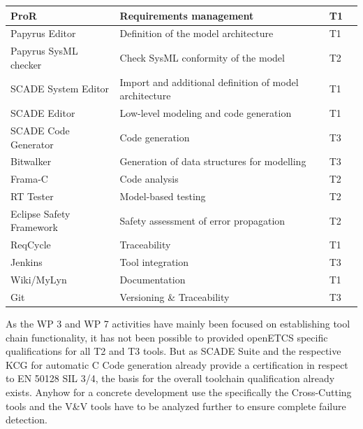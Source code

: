 \documentclass{template/openetcs_report}
\begin{document}
\begin{center}
\label{tab:ToolCat}
\tablelasttail{\hline}

\begin{supertabular}[H]{|p{2cm}|p{4cm}|p{2cm}|p{5cm}|}
\hline ProR & Requirements management & T1 & \\
\hline Papyrus Editor & Definition of the model architecture & T1 & \\
\hline Papyrus SysML checker & Check SysML conformity of the model & T2 & \\
\hline SCADE System Editor & Import and additional definition of model architecture & T1& \\
\hline SCADE Editor & Low-level modeling and code generation & T1 & \\
\hline SCADE Code Generator & Code generation & T3 & \\
\hline Bitwalker & Generation of data structures for modelling & T3 & \\
\hline Frama-C & Code analysis & T2 & \\ 
\hline RT Tester & Model-based testing & T2 & \\ 
\hline Eclipse Safety Framework & Safety assessment of error propagation& T2 & \\
\hline ReqCycle & Traceability & T1 & \\
\hline Jenkins & Tool integration & T3 & \\
\hline Wiki/MyLyn & Documentation & T1 & \\
\hline Git & Versioning \& Traceability & T3 & \\
\end{supertabular} 
\end{center}

As the WP 3 and WP 7 activities have mainly been focused on establishing tool chain functionality, it has not been possible to provided openETCS specific qualifications for all T2 and T3 tools. But as SCADE Suite and the respective KCG for automatic C Code generation already provide a certification in respect to EN 50128 SIL 3/4, the basis for the overall toolchain qualification already exists. Anyhow for a concrete development use the specifically the Cross-Cutting tools and the V\&V tools have to be analyzed further to ensure complete failure detection.
\end{document}
